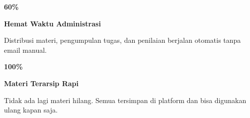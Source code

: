 \documentclass[a4paper]{article}
\begin{document}
\noindent
\begin{minipage}[t]{0.485\textwidth}
    \noindent\colorbox{BlueBg}{%
        \begin{minipage}[t][2.7cm][c]{\dimexpr\linewidth-2\fboxsep\relax}
            \centering
            {\fontsize{20}{24}\selectfont\bfseries\color{VioletPrimary} 60\%}\par\vspace{2pt}
            {\fontsize{9.5}{12}\selectfont\bfseries\color{BlueDark} Hemat Waktu Administrasi}\par\vspace{2pt}
            {\fontsize{8.5}{11}\selectfont\color{TextDark}Distribusi materi, pengumpulan tugas, dan penilaian berjalan otomatis tanpa email manual.}
        \end{minipage}}\par
    \vspace{6pt}
    \noindent\colorbox{BlueBg}{%
        \begin{minipage}[t][2.7cm][c]{\dimexpr\linewidth-2\fboxsep\relax}
            \centering
            {\fontsize{20}{24}\selectfont\bfseries\color{VioletPrimary} 100\%}\par\vspace{2pt}
            {\fontsize{9.5}{12}\selectfont\bfseries\color{BlueDark} Materi Terarsip Rapi}\par\vspace{2pt}
            {\fontsize{8.5}{11}\selectfont\color{TextDark}Tidak ada lagi materi hilang. Semua tersimpan di platform dan bisa digunakan ulang kapan saja.}
        \end{minipage}}%
\end{minipage}%
\hfill
\end{document}
